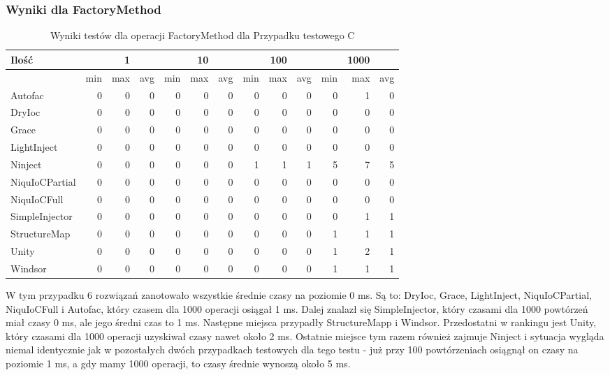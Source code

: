 \documentclass[12pt]{article}
\begin{document}
\subsubsection{Wyniki dla FactoryMethod}
\begin{table}[H]
\captionsetup{belowskip=0pt,aboveskip=0pt}
\begin{center}
\begin{small}
	\begin{tabular}{ | l | r r r | r r r | r r r | r r r | }
    		\hline
Ilość & & 1 & & & 10 & & & 100 & & & 1000 & \\ \hline
 & min & max & avg & min & max & avg & min & max & avg & min & max & avg \\ \hline
Autofac & 0 & 0 & 0 & 0 & 0 & 0 & 0 & 0 & 0 & 0 & 1 & 0 \\ \hline
DryIoc & 0 & 0 & 0 & 0 & 0 & 0 & 0 & 0 & 0 & 0 & 0 & 0 \\ \hline
Grace & 0 & 0 & 0 & 0 & 0 & 0 & 0 & 0 & 0 & 0 & 0 & 0 \\ \hline
LightInject & 0 & 0 & 0 & 0 & 0 & 0 & 0 & 0 & 0 & 0 & 0 & 0 \\ \hline
Ninject & 0 & 0 & 0 & 0 & 0 & 0 & 1 & 1 & 1 & 5 & 7 & 5 \\ \hline
NiquIoCPartial & 0 & 0 & 0 & 0 & 0 & 0 & 0 & 0 & 0 & 0 & 0 & 0 \\ \hline
NiquIoCFull & 0 & 0 & 0 & 0 & 0 & 0 & 0 & 0 & 0 & 0 & 0 & 0 \\ \hline
SimpleInjector & 0 & 0 & 0 & 0 & 0 & 0 & 0 & 0 & 0 & 0 & 1 & 1 \\ \hline
StructureMap & 0 & 0 & 0 & 0 & 0 & 0 & 0 & 0 & 0 & 1 & 1 & 1 \\ \hline
Unity & 0 & 0 & 0 & 0 & 0 & 0 & 0 & 0 & 0 & 1 & 2 & 1 \\ \hline
Windsor & 0 & 0 & 0 & 0 & 0 & 0 & 0 & 0 & 0 & 1 & 1 & 1 \\ \hline
  	\end{tabular}
\end{small}
\end{center}
\caption{Wyniki testów dla operacji FactoryMethod dla Przypadku testowego C}
\label{TestCaseC_FactoryMethod}
\end{table}
W tym przypadku 6 rozwiązań zanotowało wszystkie średnie czasy na poziomie 0 ms. Są to: DryIoc, Grace, LightInject, NiquIoCPartial, NiquIoCFull i Autofac, który czasem dla 1000 operacji osiągał 1 ms. Dalej znalazł się SimpleInjector, który czasami dla 1000 powtórzeń miał czasy 0 ms, ale jego średni czas to 1 ms. Następne miejsca przypadły StructureMapp i Windsor. Przedostatni w rankingu jest Unity, który czasami dla 1000 operacji uzyskiwał czasy nawet około 2 ms. Ostatnie miejsce tym razem również zajmuje Ninject i sytuacja wygląda niemal identycznie jak w pozostałych dwóch przypadkach testowych dla tego testu - już przy 100 powtórzeniach osiągnął on czasy na poziomie 1 ms, a gdy mamy 1000 operacji, to czasy średnie wynoszą około 5 ms.
\end{document}
